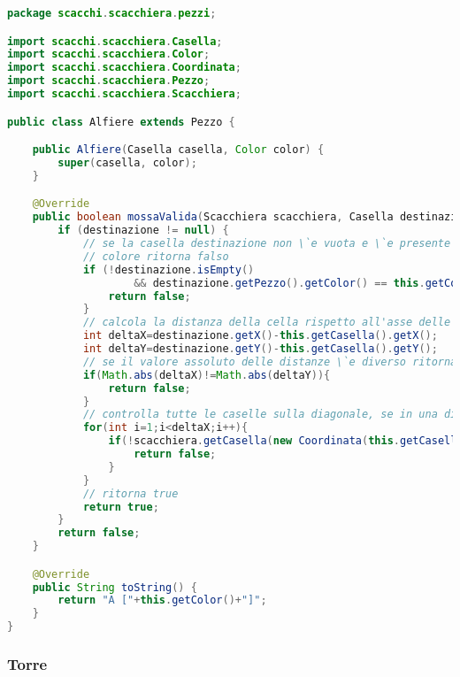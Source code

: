 \documentclass{article}
\begin{document}
\begin{lstlisting}[language=Java,escapechar=|]
package scacchi.scacchiera.pezzi;

import scacchi.scacchiera.Casella;
import scacchi.scacchiera.Color;
import scacchi.scacchiera.Coordinata;
import scacchi.scacchiera.Pezzo;
import scacchi.scacchiera.Scacchiera;

public class Alfiere extends Pezzo {

	public Alfiere(Casella casella, Color color) {
		super(casella, color);
	}

	@Override
	public boolean mossaValida(Scacchiera scacchiera, Casella destinazione) {
		if (destinazione != null) {
			// se la casella destinazione non \`e vuota e \`e presente un Pezzo dello stesso
			// colore ritorna falso
			if (!destinazione.isEmpty()
					&& destinazione.getPezzo().getColor() == this.getColor()) {
				return false;
			}
			// calcola la distanza della cella rispetto all'asse delle x e delle y
			int deltaX=destinazione.getX()-this.getCasella().getX();
			int deltaY=destinazione.getY()-this.getCasella().getY();
			// se il valore assoluto delle distanze \`e diverso ritorna false
			if(Math.abs(deltaX)!=Math.abs(deltaY)){
				return false;
			}
			// controlla tutte le caselle sulla diagonale, se in una di queste c'e' un pezzo ritorna false
			for(int i=1;i<deltaX;i++){
				if(!scacchiera.getCasella(new Coordinata(this.getCasella().getX()+Integer.signum(deltaX)*i, this.getCasella().getY()+Integer.signum(deltaY)*i)).isEmpty()){
					return false;
				}
			}
			// ritorna true
			return true;
		}
		return false;
	}

	@Override
	public String toString() {
		return "A ["+this.getColor()+"]";
	}
}
\end{lstlisting}

\subsubsection{Torre}
\end{document}
